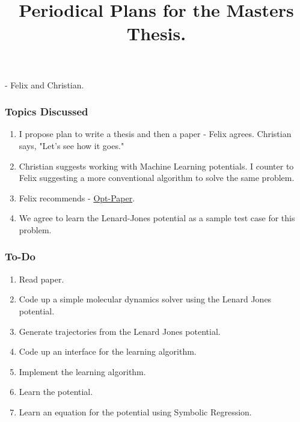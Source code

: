 

\title{Periodical Plans for the Masters Thesis.}



\maketitle

 - Felix and Christian. \\ 

\subsubsection*{Topics Discussed} 
\begin{enumerate}
    \item I propose plan to write a thesis and then a paper - Felix agrees. Christian says, "Let's see how it goes."
    \item Christian suggests working with Machine Learning potentials. I counter to Felix suggesting a more conventional algorithm to solve the same problem.
    \item Felix recommends - \href{https://www.pnas.org/doi/pdf/10.1073/pnas.1822012116}{Opt-Paper}.
    \item We agree to learn the Lenard-Jones potential as a sample test case for this problem.
\end{enumerate}


\subsubsection*{To-Do}
\begin{enumerate}
    \item Read paper.
    \item Code up a simple molecular dynamics solver using the Lenard Jones potential.
    \item Generate trajectories from the Lenard Jones potential.
    \item Code up an interface for the learning algorithm.
    \item Implement the learning algorithm.
    \item Learn the potential.
    \item Learn an equation for the potential using Symbolic Regression.
\end{enumerate}


